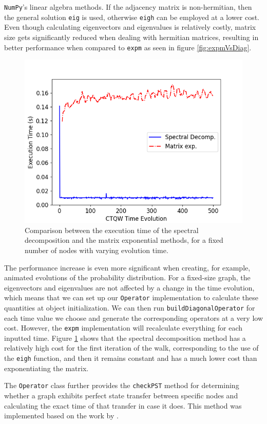 \documentclass[../../dissertation.tex]{subfiles}
\begin{document}
\texttt{NumPy}'s linear algebra methods. If the adjacency matrix is
non-hermitian, then the general solution \texttt{eig} is used, otherwise
\texttt{eigh} can be employed at a lower cost. Even though calculating
eigenvectors and eigenvalues is relatively costly, matrix size gets
significantly reduced when dealing with hermitian matrices, resulting in better
performance when compared to \texttt{expm} as seen in figure
\ref{fig:expmVsDiag}.\par
\begin{figure}[!h]
	\centering
	\includegraphics[scale=0.50]{img/QWAK/expmVsDiagTime.png}
    \caption{Comparison between the execution time of the spectral decomposition and the matrix exponential methods, for a fixed number of nodes with varying evolution time.} 
	\label{fig:expmVsDiagTime}
\end{figure}
The performance increase is even more significant when creating, for example,
animated evolutions of the probability distribution. For a fixed-size graph,
the eigenvectors and eigenvalues are not affected by a change in the time
evolution, which means that we can set up our \texttt{Operator} implementation
to calculate these quantities at object initialization. We can then run
\texttt{buildDiagonalOperator} for each time value we choose and generate the
corresponding operators at a very low cost. However, the \texttt{expm} implementation
will recalculate everything for each inputted time.
Figure \ref{fig:expmVsDiagTime} shows that the spectral decomposition method
has a relatively high cost for the first iteration of the walk, corresponding
to the use of the \texttt{eigh} function, and then it remains constant and has a much
lower cost than exponentiating the matrix.\par
The \texttt{Operator} class further provides the \texttt{checkPST} method for
determining whether a graph exhibits perfect state transfer between specific 
nodes and calculating the exact time of that transfer in case it does. This
method was implemented based on the work by \cite{coutinho17}. 
\end{document}
